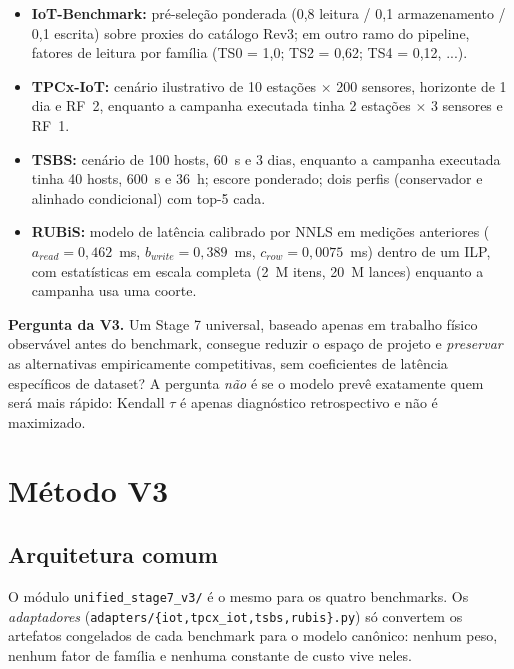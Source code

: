 \documentclass[10pt,a4paper,twoside]{article}
\newcommand{\caixa}[1]{\par\smallskip\noindent\colorbox{boxbg}{\parbox{\dimexpr\linewidth-2\fboxsep}{#1}}\par\smallskip}
\theoremstyle{definition}\newtheorem{definicao}{Definição}
\begin{document}
\begin{itemize}
\item \textbf{IoT-Benchmark:} pré-seleção ponderada (0,8 leitura / 0,1 armazenamento / 0,1 escrita) sobre proxies do
catálogo Rev3; em outro ramo do pipeline, fatores de leitura por família (TS0 = 1,0; TS2 = 0,62; TS4 = 0,12, ...).
\item \textbf{TPCx-IoT:} cenário ilustrativo de 10 estações $\times$ 200 sensores, horizonte de 1 dia e RF~2, enquanto a
campanha executada tinha 2 estações $\times$ 3 sensores e RF~1.
\item \textbf{TSBS:} cenário de 100 hosts, 60~s e 3 dias, enquanto a campanha executada tinha 40 hosts, 600~s e 36~h;
escore ponderado; dois perfis (conservador e alinhado condicional) com top-5 cada.
\item \textbf{RUBiS:} modelo de latência calibrado por NNLS em medições anteriores ($a_{read}=0{,}462$~ms,
$b_{write}=0{,}389$~ms, $c_{row}=0{,}0075$~ms) dentro de um ILP, com estatísticas em escala completa (2~M itens, 20~M
lances) enquanto a campanha usa uma coorte.
\end{itemize}

\caixa{\textbf{Pergunta da V3.} Um Stage 7 universal, baseado apenas em trabalho físico observável antes do benchmark,
consegue reduzir o espaço de projeto e \emph{preservar} as alternativas empiricamente competitivas, sem coeficientes de
latência específicos de dataset? A pergunta \emph{não} é se o modelo prevê exatamente quem será mais rápido: Kendall
$\tau$ é apenas diagnóstico retrospectivo e não é maximizado.}

\section{Método V3}
\label{sec:metodo}

\subsection{Arquitetura comum}
{\sloppy O módulo \texttt{unified\_stage7\_v3/} é o mesmo para os quatro benchmarks. Os \emph{adaptadores}
(\texttt{adapters/\{iot,tpcx\_iot,tsbs,rubis\}.py}) só convertem os artefatos congelados de cada benchmark para o modelo
canônico: nenhum peso, nenhum fator de família e nenhuma constante de custo vive neles.\par}
\end{document}
